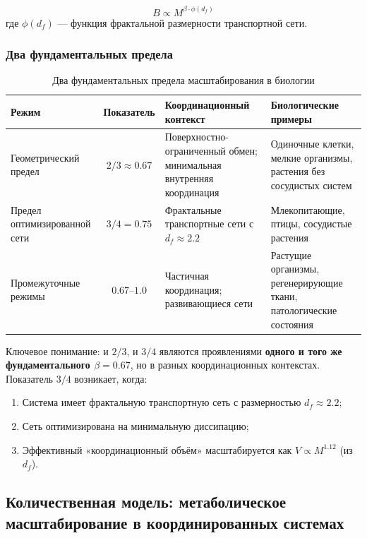 \documentclass[12pt]{article}
\begin{document}
	\begin{equation}
		B \propto M^{\beta \cdot \phi(d_f)}
	\end{equation}
	где \(\phi(d_f)\) — функция фрактальной размерности транспортной сети.
	
	\subsubsection{Два фундаментальных предела}
	
	\begin{table}[htbp]
		\centering
		\caption{Два фундаментальных предела масштабирования в биологии}
		\label{tab:scaling-limits}
		\begin{tabular}{p{3.5cm}c p{6cm} p{5cm}}
			\toprule
			\textbf{Режим} & \textbf{Показатель} & \textbf{Координационный контекст} & \textbf{Биологические примеры} \\
			\midrule
			Геометрический предел & \(2/3 \approx 0.67\) & Поверхностно-ограниченный обмен; минимальная внутренняя координация & Одиночные клетки, мелкие организмы, растения без сосудистых систем \cite{Glazier2005,Reich2006} \\
			Предел оптимизированной сети & \(3/4 = 0.75\) & Фрактальные транспортные сети с \(d_f \approx 2.2\) & Млекопитающие, птицы, сосудистые растения \cite{West1997} \\
			Промежуточные режимы & \(0.67\)–\(1.0\) & Частичная координация; развивающиеся сети & Растущие организмы, регенерирующие ткани, патологические состояния \cite{Glazier2005} \\
			\bottomrule
		\end{tabular}
	\end{table}
	
	Ключевое понимание: и \(2/3\), и \(3/4\) являются проявлениями \textbf{одного и того же фундаментального \(\beta = 0.67\)}, но в разных координационных контекстах. Показатель \(3/4\) возникает, когда:
	\begin{enumerate}
		\item Система имеет фрактальную транспортную сеть с размерностью \(d_f \approx 2.2\);
		\item Сеть оптимизирована на минимальную диссипацию;
		\item Эффективный «координационный объём» масштабируется как \(V \propto M^{1.12}\) (из \(d_f\)).
	\end{enumerate}
	
	\subsection{Количественная модель: метаболическое масштабирование в координированных системах}
	
\end{document}
